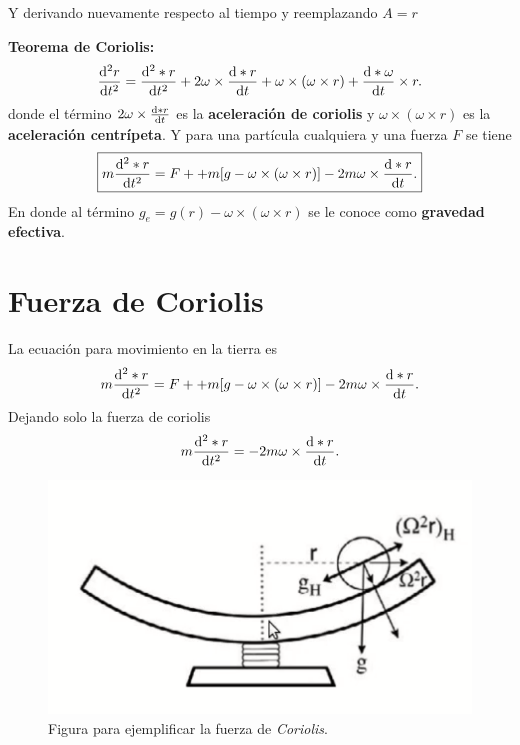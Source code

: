 Y derivando nuevamente respecto al tiempo y reemplazando $A=r$
\begin{teorema}
	\textbf{Teorema de Coriolis: }
	\begin{equation}
		\dv[2]{r}{t} = \dv[2]{* r}{t} + 2\omega \times \dv{* r}{t} + \omega \times (\omega \times r) + \dv{* \omega}{t} \times r.
	\end{equation}
	donde el término $2\omega \times \dv{* r}{t}$ es la \textbf{aceleración de coriolis} y $\omega \times (\omega \times r)$ es la \textbf{aceleración centrípeta}. Y para una partícula cualquiera y una fuerza $F$ se tiene
	\begin{equation}
		\boxed{ m\dv[2]{*r}{t} = F + + m[g - \omega \times (\omega \times r)] - 2m\omega \times \dv{*r}{t}. }
	\end{equation}
	En donde al término $g_e = g(r) - \omega \times (\omega \times r)$ se le conoce como \textbf{gravedad efectiva}.
\end{teorema}

\section{Fuerza de Coriolis}
La ecuación para movimiento en la tierra es
\begin{equation}
	m\dv[2]{*r}{t} = F + + m[g - \omega \times (\omega \times r)] - 2m\omega \times \dv{*r}{t}.
\end{equation}
Dejando solo la fuerza de coriolis
	\begin{equation}
		m\dv[2]{*r}{t} = -2m\omega \times \dv{*r}{t}.
	\end{equation}

\begin{figure}[H]
	\centering
	\includegraphics[scale=0.4]{./img/coriolis.png}
	\caption{Figura para ejemplificar la fuerza de \textit{Coriolis}.}
	\label{coriolis}
\end{figure}

